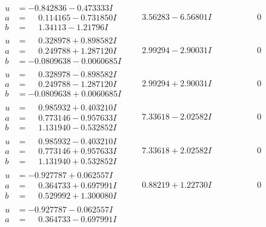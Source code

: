 \documentclass[1p]{elsarticle_modified}
\theoremstyle{definition}
\begin{document}
$$\begin{array}{c|c|c}
\begin{aligned}
u &= -0.842836 - 0.473333 I \\
a &= \phantom{-}0.114165 - 0.731850 I \\
b &= \phantom{-}1.34113 - 1.21796 I\end{aligned}
 & \phantom{-}3.56283 - 6.56801 I & \phantom{-0.000000 } 0 \\ \hline\begin{aligned}
u &= \phantom{-}0.328978 + 0.898582 I \\
a &= \phantom{-}0.249788 + 1.287120 I \\
b &= -0.0809638 - 0.0060685 I\end{aligned}
 & \phantom{-}2.99294 - 2.90031 I & \phantom{-0.000000 } 0 \\ \hline\begin{aligned}
u &= \phantom{-}0.328978 - 0.898582 I \\
a &= \phantom{-}0.249788 - 1.287120 I \\
b &= -0.0809638 + 0.0060685 I\end{aligned}
 & \phantom{-}2.99294 + 2.90031 I & \phantom{-0.000000 } 0 \\ \hline\begin{aligned}
u &= \phantom{-}0.985932 + 0.403210 I \\
a &= \phantom{-}0.773146 - 0.957633 I \\
b &= \phantom{-}1.131940 - 0.532852 I\end{aligned}
 & \phantom{-}7.33618 - 2.02582 I & \phantom{-0.000000 } 0 \\ \hline\begin{aligned}
u &= \phantom{-}0.985932 - 0.403210 I \\
a &= \phantom{-}0.773146 + 0.957633 I \\
b &= \phantom{-}1.131940 + 0.532852 I\end{aligned}
 & \phantom{-}7.33618 + 2.02582 I & \phantom{-0.000000 } 0 \\ \hline\begin{aligned}
u &= -0.927787 + 0.062557 I \\
a &= \phantom{-}0.364733 + 0.697991 I \\
b &= \phantom{-}0.529992 + 1.300080 I\end{aligned}
 & \phantom{-}0.88219 + 1.22730 I & \phantom{-0.000000 } 0 \\ \hline\begin{aligned}
u &= -0.927787 - 0.062557 I \\
a &= \phantom{-}0.364733 - 0.697991 I \\

\end{aligned}
\end{array}$$
\end{document}
